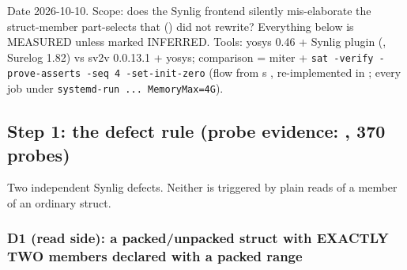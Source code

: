 \begin{record}

Date 2026-10-10. Scope: does the Synlig frontend silently mis-elaborate
the struct-member part-selects that  () did not
rewrite? Everything below is MEASURED unless marked INFERRED. Tools:
yosys 0.46 + Synlig plugin
(,
Surelog 1.82) vs sv2v 0.0.13.1 + yosys; comparison = miter +
\texttt{sat\ -\allowbreak{}verify\ -\allowbreak{}prove-\allowbreak{}asserts\ -\allowbreak{}seq\ 4\ -\allowbreak{}set-\allowbreak{}init-\allowbreak{}zero}
(flow from \textquotesingle s
, re-implemented in
; every job under
\texttt{systemd-\allowbreak{}run\ .\allowbreak{}.\allowbreak{}.\allowbreak{}\ MemoryMax=\allowbreak{}4G}).

\end{record}

\subsection{\texorpdfstring{Step 1: the defect rule (probe evidence:
, 370
probes)}{Step 1: the defect rule (probe evidence: , 370 probes)}}\label{cr:defect:synlig-struct-select-ainf:step-1-the-defect-rule-probe-evidence-toolsverifstruct-selectresultsround17txt-370-probes}

\begin{record}

Two independent Synlig defects. Neither is triggered by plain reads of a
member of an ordinary struct.

\end{record}

\subsubsection{\texorpdfstring{D1 (read side): a
packed/\allowbreak{}unpacked struct with EXACTLY TWO members declared
with a packed
range}{D1 (read side): a packed/unpacked struct with EXACTLY TWO members declared with a packed range}}\label{cr:defect:synlig-struct-select-ainf:d1-read-side-a-packedunpacked-struct-with-exactly-two-members-declared-with-a-packed-range}

